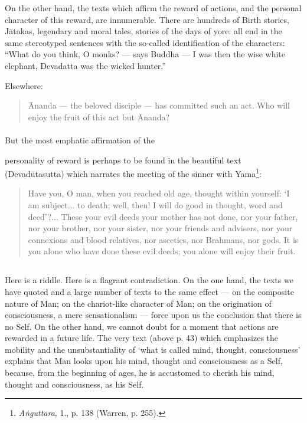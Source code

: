 \documentclass[a4paper, 11pt, oneside, english, landscape]{article}
\begin{document}
On the other hand, the texts which affirm the reward of actions, and the personal character of this reward, are innumerable. There are hundreds of Birth stories, Jātakas, legendary and moral tales, stories of the days of yore: all end in the same stereotyped sentences with the so-called identification of the characters: ``What do you think, O monks? --- says Buddha --- I was then the wise white elephant, Devadatta was the wicked hunter.''

Elsewhere:
\begin{quotation}
\small
Ānanda --- the beloved disciple --- has committed such an act. Who will enjoy the fruit of this act but Ānanda?
\end{quotation}
\paragraph{}
But the most emphatic affirmation of the 

personality of reward is perhaps to be found in the beautiful text (Devadūtasutta) which narrates the meeting of the sinner with Yama\footnote{\emph{Aṅguttara}, 1., p. 138 (Warren, p. 255).}:
\begin{quotation}
\small
Have you, O man, when you reached old age, thought within yourself: `I am subject... to death; well, then! I will do good in thought, word and deed'?... These your evil deeds your mother has not done, nor your father, nor your brother, nor your sister, nor your friends and advisers, nor your connexions and blood relatives, nor ascetics, nor Brahmans, nor gods. It is you alone who have done these evil deeds; you alone will enjoy their fruit.
\end{quotation}
\subsection{}
\paragraph{}
Here is a riddle. Here is a flagrant contradiction. On the one hand, the texts we have quoted and a large number of texts to the same effect --- on the composite nature of Man; on the chariot-like character of Man; on the origination of consciousness, a mere sensationalism --- force upon us the conclusion that there is no Self. On the other hand, we cannot doubt for a moment that actions are rewarded in a future life. The very text (above p. 43) which emphasizes the mobility and the unsubstantiality of `what is called mind, thought, consciousness' explains that Man looks upon his mind, thought and consciousness as a Self, because, from the beginning of ages, he is accustomed to cherish his mind, thought and consciousness, as his Self.
\end{document}
